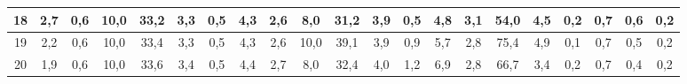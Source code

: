 \begin{sidewaystable}[]
\begin{tabular}{|c|c|c|c|c|c|c|c|c|c|c|c|c|c|c|c|c|c|c|c|c|}
    18 &  2,7                                              & 0,6                                              & 10,0                                             & 33,2                                             & 3,3                                              & 0,5                                              & 4,3                                              & 2,6                                              & 8,0                                              & 31,2                                             & 3,9                                              & 0,5                                              & 4,8                                              & 3,1                                              & 54,0                                             & 4,5                                              & 0,2                                              & 0,7                                              & 0,6                                              & 0,2                                              \\ \hline
    19 &  2,2                                              & 0,6                                              & 10,0                                             & 33,4                                             & 3,3                                              & 0,5                                              & 4,3                                              & 2,6                                              & 10,0                                             & 39,1                                             & 3,9                                              & 0,9                                              & 5,7                                              & 2,8                                              & 75,4                                             & 4,9                                              & 0,1                                              & 0,7                                              & 0,5                                              & 0,2                                              \\ \hline
    20 &  1,9                                              & 0,6                                              & 10,0                                             & 33,6                                             & 3,4                                              & 0,5                                              & 4,4                                              & 2,7                                              & 8,0                                              & 32,4                                             & 4,0                                              & 1,2                                              & 6,9                                              & 2,8                                              & 66,7                                             & 3,4                                              & 0,2                                              & 0,7                                              & 0,4                                              & 0,2                                              \\ \hline

\end{tabular}
\end{sidewaystable}

